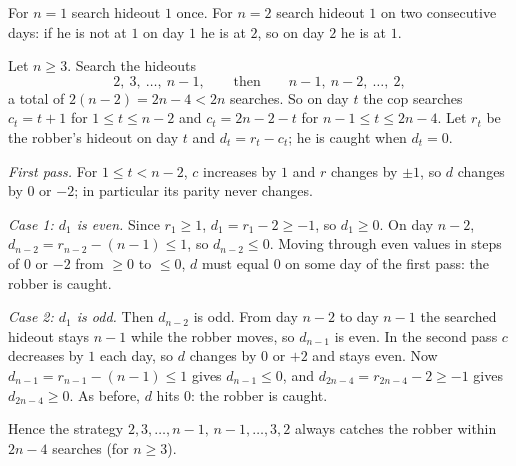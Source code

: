 For $n=1$ search hideout $1$ once. For $n=2$ search hideout $1$ on two consecutive days: if he is not at $1$ on day $1$ he is at $2$, so on day $2$ he is at $1$.

Let $n\ge3$. Search the hideouts
\[
2,\ 3,\ \dots,\ n-1,\qquad\text{then}\qquad n-1,\ n-2,\ \dots,\ 2,
\]
a total of $2(n-2)=2n-4<2n$ searches. So on day $t$ the cop searches $c_t=t+1$ for $1\le t\le n-2$ and $c_t=2n-2-t$ for $n-1\le t\le 2n-4$. Let $r_t$ be the robber's hideout on day $t$ and $d_t=r_t-c_t$; he is caught when $d_t=0$.

\emph{First pass.} For $1\le t<n-2$, $c$ increases by $1$ and $r$ changes by $\pm1$, so $d$ changes by $0$ or $-2$; in particular its parity never changes.

\emph{Case 1: $d_1$ is even.} Since $r_1\ge1$, $d_1=r_1-2\ge-1$, so $d_1\ge0$. On day $n-2$, $d_{n-2}=r_{n-2}-(n-1)\le1$, so $d_{n-2}\le0$. Moving through even values in steps of $0$ or $-2$ from $\ge0$ to $\le0$, $d$ must equal $0$ on some day of the first pass: the robber is caught.

\emph{Case 2: $d_1$ is odd.} Then $d_{n-2}$ is odd. From day $n-2$ to day $n-1$ the searched hideout stays $n-1$ while the robber moves, so $d_{n-1}$ is even. In the second pass $c$ decreases by $1$ each day, so $d$ changes by $0$ or $+2$ and stays even. Now $d_{n-1}=r_{n-1}-(n-1)\le1$ gives $d_{n-1}\le0$, and $d_{2n-4}=r_{2n-4}-2\ge-1$ gives $d_{2n-4}\ge0$. As before, $d$ hits $0$: the robber is caught.

Hence the strategy $\boxed{2,3,\dots,n-1,\,n-1,\dots,3,2}$ always catches the robber within $2n-4$ searches (for $n\ge3$).
